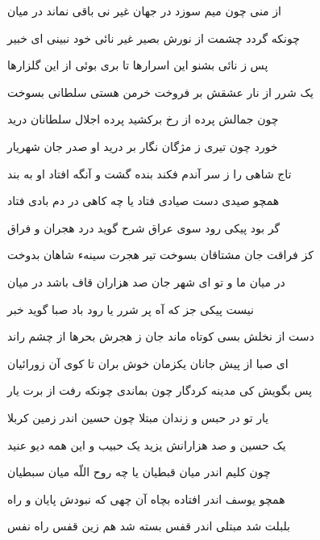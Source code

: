 از منى چون ميم سوزد در جهان
غير نى باقى نماند در ميان

چونکه گردد چشمت از نورش بصير
غير نائى خود نبينى اى خبير

پس ز نائى بشنو اين اسرارها
تا برى بوئى از اين گلزارها

يک شرر از نار عشقش بر فروخت
خرمن هستى سلطانى بسوخت

چون جمالش پرده از رخ برکشيد
پرده اجلال سلطانان دريد

خورد چون تيرى ز مژگان نگار
بر دريد او صدر جان شهريار

تاج شاهى را ز سر آندم فکند
بنده گشت و آنگه افتاد او به بند

همچو صيدى دست صيادى فتاد
يا چه کاهى در دم بادى فتاد

گر بود پيکى رود سوى عراق
شرح گويد درد هجران و فراق

کز فراقت جان مشتاقان بسوخت
تير هجرت سينهء شاهان بدوخت

در ميان ما و تو اى شهر جان
صد هزاران قاف باشد در ميان

نيست پيکى جز که آه پر شرر
يا رود باد صبا گويد خبر

دست از نخلش بسى کوتاه ماند
جان ز هجرش بحرها از چشم راند

اى صبا از پيش جانان يکزمان
خوش بران تا کوى آن زورائيان

پس بگويش کى مدينه کردگار
چون بماندى چونکه رفت از برت يار

يار تو در حبس و زندان مبتلا
چون حسين اندر زمين کربلا

يک حسين و صد هزارانش يزيد
يک حبيب و اين همه ديو عنيد

چون کليم اندر ميان قبطيان
يا چه روح اللّه ميان سبطيان

همچو يوسف اندر افتاده بچاه
آن چهى که نبودش پايان و راه

بلبلت شد مبتلی اندر قفس
بسته شد هم زين قفس راه نفس
